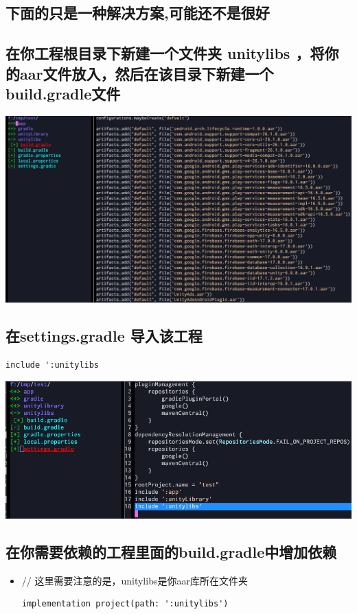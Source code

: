 \documentclass[9pt, b5paper]{article}
\begin{document}
\subsection{下面的只是一种解决方案,可能还不是很好}
\label{sec-8-2}
\subsection{在你工程根目录下新建一个文件夹 \textbf{unitylibs} ，将你的aar文件放入，然后在该目录下新建一个build.gradle文件}
\label{sec-8-3}

\includegraphics[width=.9\linewidth]{./pic/unityToAndroid_20221124_161335.png}
\subsection{在settings.gradle 导入该工程}
\label{sec-8-4}
\begin{verbatim}
include ':unitylibs
\end{verbatim}

\includegraphics[width=.9\linewidth]{./pic/unityToAndroid_20221124_161424.png}
\subsection{在你需要依赖的工程里面的build.gradle中增加依赖}
\label{sec-8-5}
\begin{itemize}
\item // 这里需要注意的是，unitylibs是你aar库所在文件夹
\begin{verbatim}
implementation project(path: ':unitylibs')
\end{verbatim}
\end{itemize}
\end{document}
